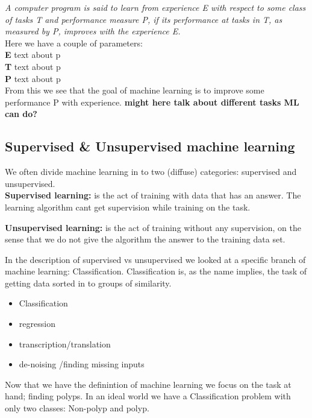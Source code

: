 \documentclass[a4paper,english]{ifimaster}
\begin{document}
	\textit{ A computer program is said to learn from experience E with respect to 
	some class of tasks T and performance measure P, if its performance at
	tasks in T, as measured by P, improves with the experience E. } 
	\cite{MitchellTomM1997Ml}\\
	
	\vspace{10px}
	Here we have a couple of parameters:\\
	\textbf{E} text about p\\
	\textbf{T} text about p\\
	\textbf{P} text about p\\
	
	From this we see that the goal of machine learning is to improve some performance P with experience.
	\textbf{might here talk about different tasks ML can do?}
	
	  \subsection{Supervised \& Unsupervised machine learning}
	  We often divide machine learning in to two (diffuse) categories: supervised and unsupervised.\\
	  \textbf{Supervised learning:} is the act of training with data that has an answer. The learning algorithm cant get supervision while 
	  training on the task. %
	  
	  \textbf{Unsupervised learning:} is the act of training without any supervision, on the sense that we do not give the algorithm the answer
	  to the training data set. %
	  
	  In the description of supervised vs unsupervised we looked at a specific branch of machine learning: Classification. Classification is, as the name implies, the task of 
	  getting data sorted in to groups of similarity. 
	  
	  
	  \begin{itemize}
	    \item Classification
	    \item regression 
	    \item transcription/translation
	    \item de-noising /finding missing inputs
	  \end{itemize}
	  
	  Now that we have the definintion of machine learning we focus on the task at hand; finding polyps. In an ideal world we have a
	  Classification problem with only two classes: Non-polyp and polyp. 
	  
\end{document}
